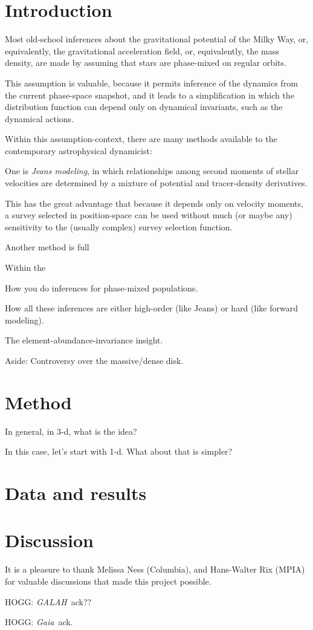 \documentclass[modern]{aastex62}
\newcommand{\acronym}[1]{{\small{#1}}}
\newcommand{\project}[1]{\textsl{#1}}
\newcommand{\galah}{\project{\acronym{GALAH}}}
\newcommand{\gaia}{\project{Gaia}}
\begin{document}

\section{Introduction}

Most old-school inferences about the gravitational potential of the
Milky Way, or, equivalently, the gravitational acceleration field, or,
equivalently, the mass density, are made by assuming that stars are
phase-mixed on regular orbits.

This assumption is valuable, because it permits inference of the
dynamics from the current phase-space snapshot, and it leads to a
simplification in which the distribution function can depend only on
dynamical invariants, such as the dynamical actions.

Within this assumption-context, there are many methods available to the
contemporary astrophysical dynamicist:

One is \emph{Jeans modeling}, in which relationships among second moments
of stellar velocities are determined by a mixture of potential and
tracer-density derivatives.

This has the great advantage that because it depends only on velocity
moments, a survey selected in position-space can be used without much
(or maybe any) sensitivity to the (usually complex) survey selection
function.

Another method is full 



Within the 

How you do inferences for phase-mixed populations.

How all these inferences are either high-order (like Jeans) or hard (like forward modeling).

The element-abundance-invariance insight.

Aside: Controversy over the massive/dense disk.

\section{Method}

In general, in 3-d, what is the idea?

In this case, let's start with 1-d. What about that is simpler?

\section{Data and results}

\section{Discussion}

\acknowledgements
It is a pleasure to thank
  Melissa Ness (Columbia),
  and
  Hans-Walter Rix (\acronym{MPIA})
for valuable discussions that made this project possible.

HOGG: \galah\ ack??

HOGG: \gaia\ ack.
\end{document}
